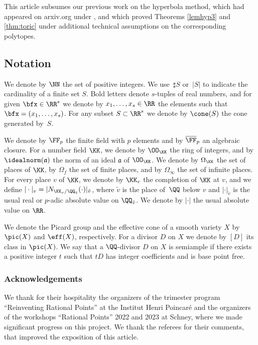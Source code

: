 This article subsumes our previous work on the hyperbola method, which had appeared on arxiv.org under , and which proved Theorems \ref{lemhyp3} and \ref{thm:toric} under additional technical assumptions on the corresponding polytopes.

\subsection{Notation}
We denote by $\NN$ the set of positive integers.
We use~$\sharp S$ or~$| S |$ to indicate the cardinality of a finite set $S$.
Bold letters denote $s$-tuples of real numbers, and for given $\bfx\in\RR^s$
we denote by $x_1,\dots,x_s\in\RR$ the elements such that $\bfx=(x_1,\dots,x_s)$.
For any subset $S\subset\RR^s$ we denote by $\cone(S)$ the cone generated by~$S$.

We denote by $\FF_p$ the finite field with $p$ elements and by $\overline{\FF}_p$ an algebraic closure. For a number field $\KK$, we denote by $\OO_{\KK}$ the ring of integers,
and by $\idealnorm(\mathfrak a)$ the norm of an ideal $\mathfrak a$ of $\OO_{\KK}$.
We denote by $\Omega_{\KK}$ the set of places of $\KK$, by $\Omega_f$ the set of finite places,
and by $\Omega_\infty$ the set of infinite places.
For every place $v$ of $\KK$, we denote by $\KK_v$ the completion of $\KK$ at $v$,
and we define $|\cdot|_v=|N_{\KK_v/\QQ_{\tilde v}}(\cdot)|_{\tilde v}$,
where $\tilde v$ is the place of~$\QQ$ below $v$ and $|\cdot|_{\tilde v}$ is the usual real
or $p$-adic absolute value on $\QQ_{\tilde v}$.
We denote by $|\cdot|$ the usual absolute value on $\RR$.

We denote the Picard group and the effective cone of a smooth variety $X$
by $\pic(X)$ and $\eff(X)$, respectively.
For a divisor $D$ on $X$ we denote by $[D]$ its class in $\pic(X)$.
We say that a $\QQ$-divisor $D$ on $X$ is semiample if there exists a positive integer $t$
such that $tD$ has integer coefficients and is base point free.

\subsubsection*{Acknowledgements}
We thank for their hospitality the organizers of the trimester program
``Reinventing Rational Points'' at the Institut Henri Poincaré and the organizers of the workshops ``Rational Points'' 2022 and 2023 at Schney, where we made significant progress on this project. We thank the referees for their comments, that improved the exposition of this article.

